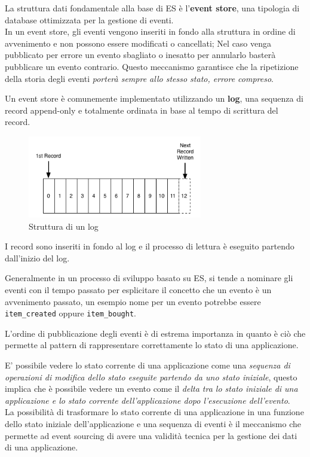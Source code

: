 \documentclass[]{article}
\begin{document}
La struttura dati fondamentale alla base di ES è l'\textbf{event store},
una tipologia di database ottimizzata per la gestione di eventi.\\
In un event store, gli eventi vengono inseriti in fondo alla struttura
in ordine di avvenimento e non possono essere modificati o cancellati;
Nel caso venga pubblicato per errore un evento sbagliato o inesatto per
annularlo basterà pubblicare un evento contrario. Questo meccanismo
garantisce che la ripetizione della storia degli eventi \emph{porterà
sempre allo stesso stato, errore compreso}.

Un event store è comunemente implementato utilizzando un \textbf{log},
una sequenza di record append-only e totalmente ordinata in base al
tempo di scrittura del record.

\begin{figure}
\centering
\includegraphics[width=0.68000\textwidth]{../images/log.png}
\caption{Struttura di un log \label{figure_1}}
\end{figure}

I record sono inseriti in fondo al log e il processo di lettura è
eseguito partendo dall'inizio del log.

Generalmente in un processo di sviluppo basato su ES, si tende a
nominare gli eventi con il tempo passato per esplicitare il concetto che
un evento è un avvenimento passato, un esempio nome per un evento
potrebbe essere \texttt{item\_created} oppure \texttt{item\_bought}.

L'ordine di pubblicazione degli eventi è di estrema importanza in quanto
è ciò che permette al pattern di rappresentare correttamente lo stato di
una applicazione.

E' possibile vedere lo stato corrente di una applicazione come una
\emph{sequenza di operazioni di modifica dello stato eseguite partendo
da uno stato iniziale}, questo implica che è possibile vedere un evento
come il \emph{delta tra lo stato iniziale di una applicazione e lo stato
corrente dell'applicazione dopo l'esecuzione dell'evento}.\\
La possibilità di trasformare lo stato corrente di una applicazione in
una funzione dello stato iniziale dell'applicazione e una sequenza di
eventi è il meccanismo che permette ad event sourcing di avere una
validità tecnica per la gestione dei dati di una applicazione.
\end{document}
